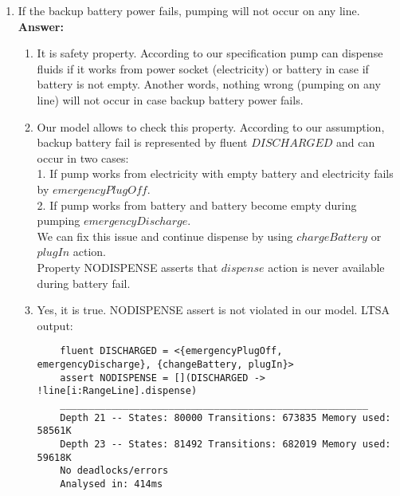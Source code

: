 \documentclass{article}
\begin{document}
\begin{enumerate}
    \item If the backup battery power fails, pumping will not occur on any line.\\
    \textbf{Answer:}
    \begin{enumerate}
    \item It is safety property. According to our specification pump can dispense fluids if it works from power
    socket (electricity) or battery in case if battery is not empty. Another words, nothing wrong (pumping on any line) will
    not occur in case backup battery power fails.
 
    \item Our model allows to check this property. According to our assumption, backup battery fail is represented by fluent
    $DISCHARGED$ and can occur in two cases:\\
    1. If pump works from electricity with empty battery and electricity fails by $emergencyPlugOff$. \\
    2. If pump works from battery and battery become empty during pumping $emergencyDischarge$. \\
    We can fix this issue and continue dispense by using $chargeBattery$ or $plugIn$ action.\\
    Property NODISPENSE asserts that $dispense$ action is never available during battery fail.
    
    \item  Yes, it is true. NODISPENSE assert is not violated in our model. LTSA output:
    \begin{verbatim}
    fluent DISCHARGED = <{emergencyPlugOff, emergencyDischarge}, {changeBattery, plugIn}>
    assert NODISPENSE = [](DISCHARGED -> !line[i:RangeLine].dispense)
    ______________________________________________________
    Depth 21 -- States: 80000 Transitions: 673835 Memory used: 58561K
    Depth 23 -- States: 81492 Transitions: 682019 Memory used: 59618K
    No deadlocks/errors
    Analysed in: 414ms
    \end{verbatim} 
    \end{enumerate}    
    

\end{enumerate}
\end{document}
